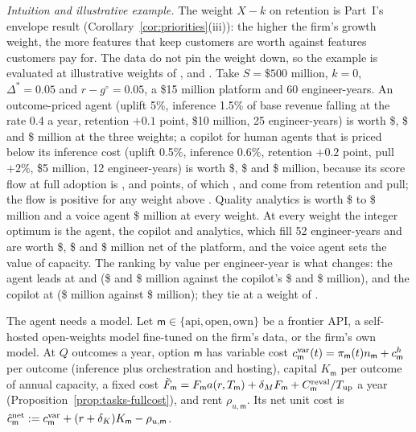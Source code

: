 \noindent\emph{Intuition and illustrative example.} The weight $X-k$ on retention is Part~I's envelope result (Corollary~\ref{cor:priorities}(iii)): the higher the firm's growth weight, the more features that keep customers are worth against features customers pay for. The data do not pin the weight down, so the example is evaluated at illustrative weights of \prodXbOne, \prodXbTwo{} and \prodXbThree. %
Take $S=\$500$ million, $k=0$, $\Delta^*=0.05$ and $r-g^\circ=0.05$, a \$15 million platform and 60 engineer-years. An outcome-priced agent (uplift 5\%, inference 1.5\% of base revenue falling at the rate 0.4 a year, retention $+0.1$ point, \$10 million, 25 engineer-years) is worth \$\prodAgentOne, \$\prodAgentTwo{} and \$\prodAgentThree{} million at the three weights; a copilot for human agents that is priced below its inference cost (uplift 0.5\%, inference 0.6\%, retention $+0.2$ point, pull $+2$\%, \$5 million, 12 engineer-years) is worth \$\prodCopilotOne, \$\prodCopilotTwo{} and \$\prodCopilotThree{} million, because its score flow at full adoption is \prodFlowOne, \prodFlowTwo{} and \prodFlowThree{} points, of which \prodRetOne, \prodRetTwo{} and \prodRetThree{} come from retention and pull; the flow is positive for any weight above \prodFlowZero. Quality analytics is worth \$\prodQAOne{} to \$\prodQAThree{} million and a voice agent \$\prodVoice{} million at every weight. At every weight the integer optimum is the agent, the copilot and analytics, which fill 52 engineer-years and are worth \$\prodBestOne, \$\prodBestTwo{} and \$\prodBestThree{} million net of the platform, and the voice agent sets the value of capacity. The ranking by value per engineer-year is what changes: the agent leads at \prodXbOne{} and \prodXbTwo{} (\$\prodAgentPerOne{} and \$\prodAgentPerTwo{} million against the copilot's \$\prodCopilotPerOne{} and \$\prodCopilotPerTwo{} million), and the copilot at \prodXbThree{} (\$\prodCopilotPerThree{} million against \$\prodAgentPerThree{} million); they tie at a weight of \prodRankCross. %

The agent needs a model. Let $\mathsf m\in\{\mathrm{api},\mathrm{open},\mathrm{own}\}$ be a frontier API, a self-hosted open-weights model fine-tuned on the firm's data, or the firm's own model. At $Q$ outcomes a year, option $\mathsf m$ has variable cost $c^{\rm var}_{\mathsf m}(t)=\pi_{\mathsf m}(t)n_{\mathsf m}+c^h_{\mathsf m}$ per outcome (inference plus orchestration and hosting), capital $K_{\mathsf m}$ per outcome of annual capacity, a fixed cost $\tilde F_{\mathsf m}=F_{\mathsf m}a(r,T_{\mathsf m})+\delta_MF_{\mathsf m}+C^{\rm reval}_{\mathsf m}/T_{\rm up}$ a year (Proposition~\ref{prop:tasks-fullcost}), and rent $\rho_{u,\mathsf m}$. Its net unit cost is $\hat c^{\rm net}_{\mathsf m}:=c^{\rm var}_{\mathsf m}+(r+\delta_K)K_{\mathsf m}-\rho_{u,\mathsf m}$.

